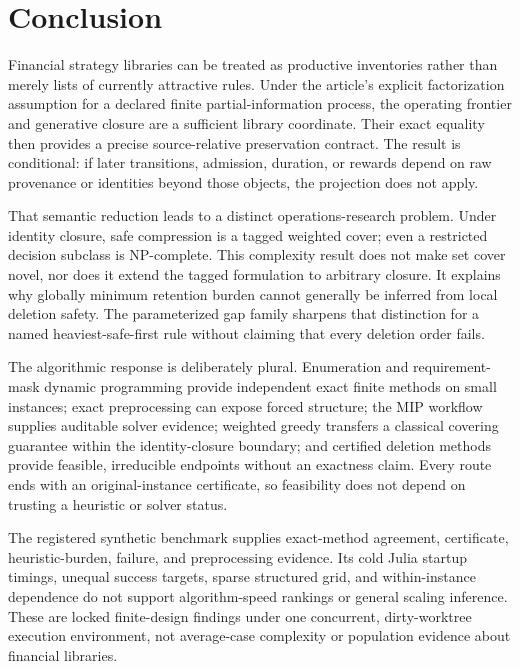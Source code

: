 \section{Conclusion}
\label{sec:conclusion}

Financial strategy libraries can be treated as productive inventories rather
than merely lists of currently attractive rules. Under the article's explicit
factorization assumption for a declared finite partial-information process,
the operating frontier and generative closure are a sufficient library
coordinate. Their exact equality then provides a precise source-relative
preservation contract. The result is conditional: if later transitions,
admission, duration, or rewards depend on raw provenance or identities beyond
those objects, the projection does not apply.

That semantic reduction leads to a distinct operations-research problem.
Under identity closure, safe compression is a tagged weighted cover; even a
restricted decision subclass is NP-complete. This complexity result does not
make set cover novel, nor does it extend the tagged formulation to arbitrary
closure. It explains why globally minimum retention burden cannot generally be
inferred from local deletion safety. The parameterized gap family sharpens
that distinction for a named heaviest-safe-first rule without claiming that
every deletion order fails.

The algorithmic response is deliberately plural. Enumeration and
requirement-mask dynamic programming provide independent exact finite methods
on small instances; exact preprocessing can expose forced structure; the MIP
workflow supplies auditable solver evidence; weighted greedy transfers a
classical covering guarantee within the identity-closure boundary; and
certified deletion methods provide feasible, irreducible endpoints without an
exactness claim. Every route ends with an original-instance certificate, so
feasibility does not depend on trusting a heuristic or solver status.

The registered synthetic benchmark supplies exact-method agreement,
certificate, heuristic-burden, failure, and preprocessing evidence. Its cold
Julia startup timings, unequal success targets, sparse structured grid, and
within-instance dependence do not support algorithm-speed rankings or general
scaling inference. These are locked finite-design findings under one
concurrent, dirty-worktree execution environment, not average-case complexity
or population evidence about financial libraries.

